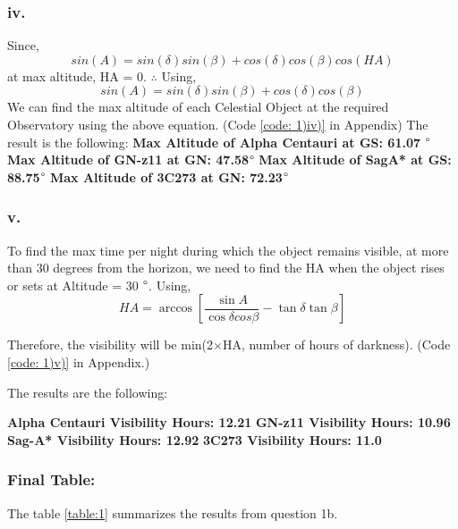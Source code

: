 \documentclass{article}
\begin{document}
        \subsubsection*{iv.}
            Since, \[sin(A) = sin(\delta)sin(\beta) + cos(\delta)cos(\beta)cos(HA)\]
            at max altitude, HA = 0. $\therefore$ Using, \[sin(A) = sin(\delta)sin(\beta) + cos(\delta)cos(\beta)\]
            We can find the max altitude of each Celestial Object at the required Observatory using the above equation. (Code \ref{code: 1)iv)} in Appendix)
            The result is the following:
            \textbf{Max Altitude of Alpha Centauri at GS:  61.07} $\degree$\newline
            \textbf{ Max Altitude of GN-z11 at GN:  47.58$\degree$}\newline
            \textbf{ Max Altitude of SagA* at GS:  88.75$\degree$}\newline
            \textbf{Max Altitude of 3C273 at GN:  72.23$\degree$}\newline
            
        \subsubsection*{v.}
        
        To find the max time per night during which the object remains visible, at more than 30 degrees from the horizon, we need to find the HA when the object rises or sets at Altitude = 30 $\degree$.
        Using,
        \[HA = \arccos[{\frac{\sin{A}}{\cos{\delta}cos{\beta}} - \tan{\delta}\tan{\beta}}]\]
        
        Therefore, the visibility will be min(2$\times$HA, number of hours of darkness). (Code \ref{code: 1)v)} in Appendix.)
        
        The results are the following:
        
        \textbf{Alpha Centauri Visibility Hours:  12.21}\newline
        \textbf{GN-z11 Visibility Hours:  10.96}\newline
        \textbf{Sag-A* Visibility Hours:  12.92}\newline
        \textbf{3C273 Visibility Hours:  11.0}\newline
        
    \subsubsection*{Final Table:}
        The table \ref{table:1} summarizes the results from question 1b.
        
\end{document}
